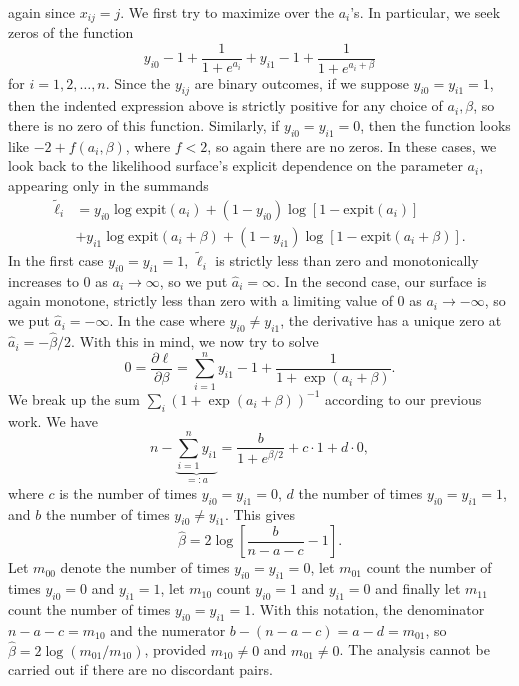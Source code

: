 \documentclass[11pt]{article}
\begin{document}
\begin{enumerate}
\begin{enumerate}
\begin{align*}
			\end{align*}again since $x_{ij}=j$. We first try to maximize over the $a_i$'s. In particular, we seek zeros of the function
			\[
				y_{i0} - 1 + \frac{1}{1+e^{a_i}} + y_{i1} - 1 + \frac{1}{1+e^{a_i+\beta}}
			\]
			for $i=1,2,\dotsc,n$. Since the $y_{ij}$ are binary outcomes, if we suppose $y_{i0}=y_{i1}=1$, then the indented expression above is strictly positive for any choice of $a_i,\beta$, so there is no zero of this function. Similarly, if $y_{i0}=y_{i1}=0$, then the function looks like $-2 + f(a_i,\beta)$, where $f < 2$, so again there are no zeros. In these cases, we look back to the likelihood surface's explicit dependence on the parameter $a_i$, appearing only in the summands
			\begin{align*}
				\widetilde{\ell}_i &= y_{i0} \log\mathrm{expit}(a_i) + (1-y_{i0}) \log[1-\mathrm{expit}(a_i)] \\
				&+ y_{i1} \log\mathrm{expit}(a_i+\beta) + (1-y_{i1}) \log[1-\mathrm{expit}(a_i+\beta)].
			\end{align*}
			In the first case $y_{i0}=y_{i1}=1$, $\widetilde{\ell}_i$ is strictly less than zero and monotonically increases to 0 as $a_i\to\infty$, so we put $\widehat{a}_i = \infty$. In the second case, our surface is again monotone, strictly less than zero with a limiting value of 0 as $a_i\to-\infty$, so we put $\widehat{a}_i = -\infty$. In the case where $y_{i0}\neq y_{i1}$, the derivative has a unique zero at $\widehat{a}_i = -\widehat{\beta}/2$. With this in mind, we now try to solve
			\[
				0 = \frac{\partial \ell}{\partial \beta} = \sum_{i=1}^n y_{i1} - 1 + \frac{1}{1+\exp(a_i+\beta)}.
			\]
			We break up the sum $\sum_i (1+\exp(a_i+\beta))^{-1}$ according to our previous work. We have
			\[
				n - \underbrace{\sum_{i=1}^n y_{i1}}_{=:a} = \frac{b}{1+e^{\beta/2}} + c\cdot 1 + d\cdot 0,
			\]
			where $c$ is the number of times $y_{i0}=y_{i1}=0$, $d$ the number of times $y_{i0}=y_{i1}=1$, and $b$ the number of times $y_{i0}\neq y_{i1}$. This gives
			\[
				\widehat{\beta} = 2\log\left[\frac{b}{n-a-c} - 1\right].
			\]
			Let $m_{00}$ denote the number of times $y_{i0}=y_{i1}=0$, let $m_{01}$ count the number of times $y_{i0}=0$ and $y_{i1}=1$, let $m_{10}$ count $y_{i0}=1$ and $y_{i1}=0$ and finally let $m_{11}$ count the number of times $y_{i0}=y_{i1}=1$. With this notation, the denominator $n-a-c=m_{10}$ and the numerator $b-(n-a-c) = a-d =m_{01}$, so $\widehat{\beta} = 2\log(m_{01}/m_{10})$, provided $m_{10}\neq 0$ and $m_{01}\neq 0$. The analysis cannot be carried out if there are no discordant pairs.

\end{enumerate}
\end{enumerate}
\end{document}
